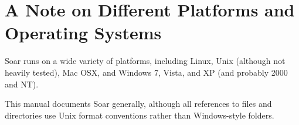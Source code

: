 \section{A Note on Different Platforms and Operating Systems}
\label{INTRO-platforms}

Soar runs on a wide variety of platforms, including Linux, Unix
(although not heavily tested), Mac OSX, and Windows 7, Vista, and XP
(and probably 2000 and NT).

This manual documents Soar generally, although all references to files
and directories use Unix format conventions rather than Windows-style folders.

